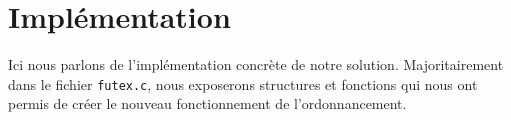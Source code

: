 \section*{Implémentation}

Ici nous parlons de l'implémentation concrète de notre solution. Majoritairement dans le fichier \verb|futex.c|, nous exposerons structures et fonctions qui nous ont permis de créer le nouveau fonctionnement de l'ordonnancement.
